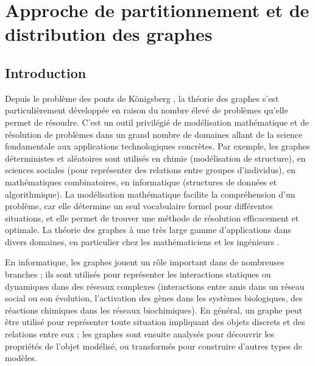 \chapter{Approche de partitionnement et de distribution des graphes}
	\minitoc
	\newpage

\section{Introduction} 
Depuis le problème des ponts de Königsberg \citep{EULER1736}, la théorie des graphes s'est particulièrement développée en raison du nombre élevé de problèmes qu'elle permet de résoudre. C'est un outil privilégié de modélisation mathématique et de résolution de problèmes dans un grand nombre de domaines allant de la science fondamentale aux applications technologiques concrètes. Par exemple, les graphes déterministes et aléatoires sont utilisés en chimie (modélisation de structure), en sciences sociales (pour représenter des relations entre groupes d’individus), en mathématiques combinatoires, en informatique (structures de données et algorithmique). La modélisation mathématique facilite la compréhension d'un problème, car elle détermine un seul vocabulaire formel pour différentes situations, et elle permet de trouver une méthode de résolution efficacement et optimale. La théorie des graphes à une très large gamme d'applications dans divers domaines, en particulier chez les mathématiciens et les ingénieurs \citep{DEO2017}.

En informatique, les graphes jouent un rôle important dans de nombreuses branches ; ils sont utilisés pour représenter les interactions statiques ou dynamiques dans des réseaux complexes (interactions entre amis dans un réseau social ou son évolution, l'activation des gènes dans les systèmes biologiques, des réactions chimiques dans les réseaux biochimiques). En général, un graphe peut être utilisé pour représenter toute situation impliquant des objets discrets et des relations entre eux ; les graphes sont ensuite analysés pour découvrir les propriétés de l'objet modélisé, ou transformés pour construire d'autres types de modèles.

